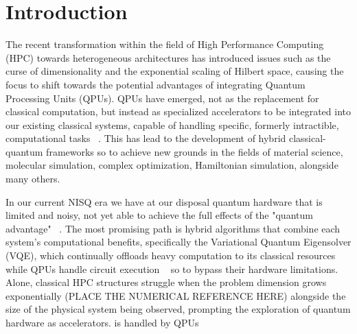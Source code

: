 \section{Introduction}
\label{sec:introduction}


    The recent transformation within the field of High Performance Computing (HPC) towards heterogeneous architectures has 
    introduced issues such as the curse of dimensionality and the exponential scaling of Hilbert space, 
    causing the focus to shift towards the potential advantages of integrating Quantum Processing Units (QPUs). 
    QPUs have emerged, not as the replacement for classical computation, but 
    instead as specialized accelerators to be integrated into our existing classical systems, capable of handling 
    specific, formerly intractible, computational tasks ~\parencite{rallis2025interfacingquantumcomputingsystems}. This has lead to the 
    development of hybrid classical-quantum frameworks so to achieve new grounds in the fields of material science, 
    molecular simulation, complex optimization, Hamiltonian simulation, alongside many others.   


    In our current NISQ era we have at our disposal quantum hardware that is limited and noisy, not yet 
    able to achieve the full effects of the "quantum advantage" ~\parencite{harrow2017quantumsupremacy}. The most promising path 
    is hybrid algorithms that combine each system's computational benefits,   
    specifically the Variational Quantum Eigensolver (VQE), which continually offloads heavy computation to its classical resources while 
    QPUs handle circuit execution ~\parencite{peruzzo2014variational, rallis2025interfacingquantumcomputingsystems} so to bypass their hardware limitations. 
    Alone, classical HPC structures struggle when the problem dimension grows exponentially (PLACE THE NUMERICAL REFERENCE HERE) alongside 
    the size of the physical system being observed, prompting the exploration of quantum hardware as accelerators. is handled by QPUs 

